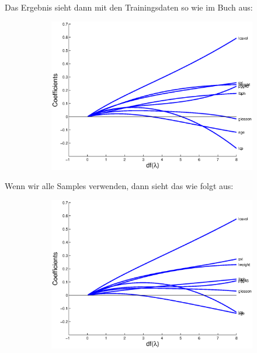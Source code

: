 \documentclass{article}
\begin{document}
Das Ergebnis sieht dann mit den Trainingsdaten so wie im Buch aus:
\begin{figure}[H]
  \begin{subfigure}
    \centering
    \includegraphics[scale=0.75]{ridgeregression-tra.eps}
  \end{subfigure}
\end{figure}
\newpage
Wenn wir alle Samples verwenden, dann sieht das wie folgt aus:
\begin{figure}[H]
  \begin{subfigure}
    \centering
    \includegraphics[scale=0.75]{ridgeregression-all.eps}
  \end{subfigure}
\end{figure}
\end{document}
